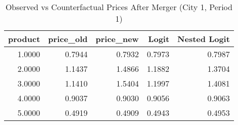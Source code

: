 \begin{table}[H]
    \centering
    \caption{Observed vs Counterfactual Prices After Merger (City 1, Period 1)}
    \label{tab:q11_prices_counterfactual_city1_period1}
\begin{tabular}{rrrrr}
\toprule
product & price\_old & price\_new & Logit & Nested Logit \\
\midrule
\midrule
1.0000 & 0.7944 & 0.7932 & 0.7973 & 0.7987 \\
2.0000 & 1.1437 & 1.4866 & 1.1882 & 1.3704 \\
3.0000 & 1.1410 & 1.5404 & 1.1997 & 1.4081 \\
4.0000 & 0.9037 & 0.9030 & 0.9056 & 0.9063\\
5.0000 & 0.4919 & 0.4909 & 0.4943 & 0.4953 \\
\bottomrule
\bottomrule
\end{tabular}

\end{table}
